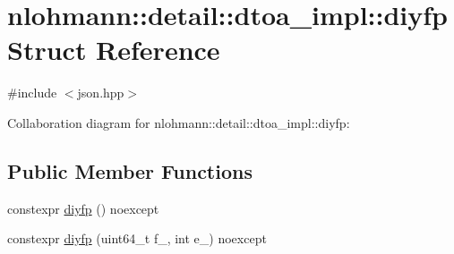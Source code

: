 \hypertarget{structnlohmann_1_1detail_1_1dtoa__impl_1_1diyfp}{}\section{nlohmann\+:\+:detail\+:\+:dtoa\+\_\+impl\+:\+:diyfp Struct Reference}
\label{structnlohmann_1_1detail_1_1dtoa__impl_1_1diyfp}


{\ttfamily \#include $<$json.\+hpp$>$}



Collaboration diagram for nlohmann\+:\+:detail\+:\+:dtoa\+\_\+impl\+:\+:diyfp\+:
\subsection*{Public Member Functions}
\begin{DoxyCompactItemize}
\item 
constexpr \hyperlink{structnlohmann_1_1detail_1_1dtoa__impl_1_1diyfp_a23d25b3ad4527270a6e3f2a0bcca11e6}{diyfp} () noexcept
\item 
constexpr \hyperlink{structnlohmann_1_1detail_1_1dtoa__impl_1_1diyfp_a332ba792e67dd40cd99a23f6dceb7792}{diyfp} (uint64\+\_\+t f\+\_\+, int e\+\_\+) noexcept
\end{DoxyCompactItemize}
